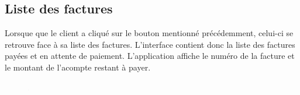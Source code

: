 \subsection{Liste des factures}
\begin{flushleft}
Lorsque que le client a cliqué sur le bouton mentionné précédemment, celui-ci se retrouve face à sa liste des factures. L'interface contient donc la liste des factures payées et en attente de paiement. L'application affiche le numéro de la facture et le montant de l'acompte restant à payer.
\end{flushleft}
\begin{figure}[h]
\centering
\includegraphics[width = 1]{extension-maxime/interface/img/list.png}
\end{figure}

